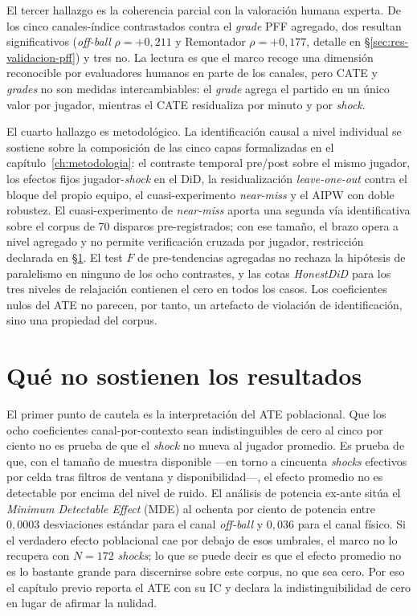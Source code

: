 El tercer hallazgo es la coherencia parcial con la valoración humana
experta. De los cinco canales-índice contrastados contra el
\textit{grade} PFF agregado, dos resultan significativos
(\textit{off-ball} $\rho = +0{,}211$ y Remontador $\rho = +0{,}177$,
detalle en §\ref{sec:res-validacion-pff}) y tres no. La lectura es
que el marco recoge una dimensión reconocible por evaluadores
humanos en parte de los canales, pero CATE y \textit{grades} no son
medidas intercambiables: el \textit{grade} agrega el partido en un
único valor por jugador, mientras el CATE residualiza por minuto y
por \textit{shock}.

El cuarto hallazgo es metodológico. La identificación causal a nivel
individual se sostiene sobre la composición de las cinco capas
formalizadas en el capítulo~\ref{ch:metodologia}: el contraste
temporal pre/post sobre el mismo jugador, los efectos fijos
jugador-\textit{shock} en el DiD, la residualización
\textit{leave-one-out} contra el bloque del propio equipo, el
cuasi-experimento \textit{near-miss} y el AIPW con doble robustez.
El cuasi-experimento de \textit{near-miss} aporta una segunda vía
identificativa sobre el corpus de 70 disparos pre-registrados; con
ese tamaño, el brazo opera a nivel agregado y no permite
verificación cruzada por jugador, restricción declarada en
§\ref{sec:disc-no-demuestran}. El test $F$ de pre-tendencias
agregadas \parencite{Roth2022Pretest} no rechaza la hipótesis de
paralelismo en ninguno de los ocho contrastes, y las cotas
\textit{HonestDiD} \parencite{RambachanRoth2023} para los tres
niveles de relajación contienen el cero en todos los casos. Los
coeficientes nulos del ATE no parecen, por tanto, un artefacto de
violación de identificación, sino una propiedad del corpus.


\section{Qué no sostienen los resultados}
\label{sec:disc-no-demuestran}

El primer punto de cautela es la interpretación del ATE poblacional.
Que los ocho coeficientes canal-por-contexto sean indistinguibles de
cero al cinco por ciento no es prueba de que el \textit{shock} no
mueva al jugador promedio. Es prueba de que, con el tamaño de muestra
disponible ---en torno a cincuenta \textit{shocks} efectivos por
celda tras filtros de ventana y disponibilidad---, el efecto promedio
no es detectable por encima del nivel de ruido. El análisis de
potencia ex-ante sitúa el \textit{Minimum Detectable Effect} (MDE) al
ochenta por ciento de potencia entre $0{,}0003$ desviaciones estándar
para el canal \textit{off-ball} y $0{,}036$ para el canal físico. Si
el verdadero efecto poblacional cae por debajo de esos umbrales, el
marco no lo recupera con $N = 172$ \textit{shocks}; lo que se puede
decir es que el efecto promedio no es lo bastante grande para
discernirse sobre este corpus, no que sea cero. Por eso el capítulo
previo reporta el ATE con su IC y declara la indistinguibilidad de
cero en lugar de afirmar la nulidad.

